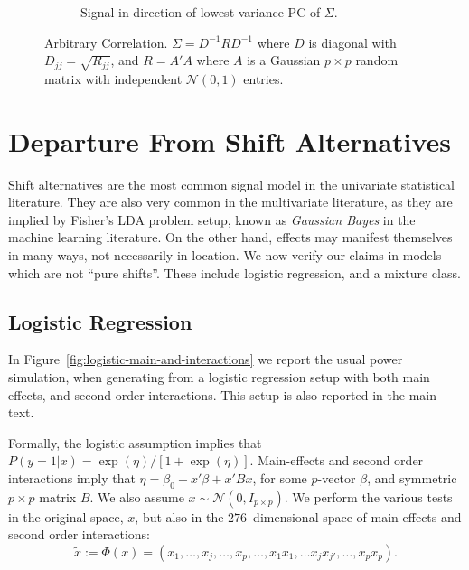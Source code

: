 \documentclass[]{bio}
\begin{document}
\begin{figure}[h]
\begin{subfigure}[t]{.45\columnwidth}
		\caption{Signal in direction of lowest variance PC of $\Sigma$.} 
		\label{fig:dependence_32}
	\end{subfigure}
	\caption{Arbitrary Correlation. 
		$\Sigma=D^{-1} R D^{-1}$ where $D$ is diagonal with $D_{jj}=\sqrt{R_{jj}}$, and $R=A'A$ where $A$ is a Gaussian $p\times p$ random matrix with independent $\mathcal{N}(0,1)$ entries.
	}
	\label{fig:dependence_3}
\end{figure}






\section{Departure From Shift Alternatives}

Shift alternatives are the most common signal model in the univariate statistical literature. 
They are also very common in the multivariate literature, as they are implied by Fisher's LDA problem setup, known as \emph{Gaussian Bayes} in the machine learning literature.
On the other hand, effects may manifest themselves in many ways, not necessarily in location. 
We now verify our claims in models which are not ``pure shifts''. 
These include logistic regression, and a mixture class. 


\subsection{Logistic Regression}

In Figure~\ref{fig:logistic-main-and-interactions} we report the usual power simulation, when generating from a logistic regression setup with both main effects, and second order interactions.
This setup is also reported in the main text.

Formally, the logistic assumption implies that 
$P(y=1|x)=\exp(\eta)/[1+\exp(\eta)]$.
Main-effects and second order interactions imply that 
$\eta=\beta_0+x'\beta +x'Bx$, for some $p$-vector $\beta$, and symmetric $p \times p$ matrix $B$.
We also assume $x \sim \mathcal{N}(0,I_{p\times p})$.
We perform the various tests in the original space, $x$, but also in the $276$~dimensional space of main effects and second order interactions: 
$$\tilde{x}:=\Phi(x)=(x_1,\dots,x_j,\dots,x_p,\dots,x_1x_1,\dots x_jx_{j'},\dots,x_p x_p).$$
\end{document}
